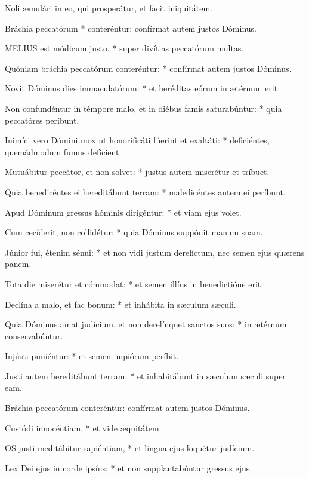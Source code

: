  Noli æmulári in eo, qui prosperátur, et facit iniquitátem.

 Bráchia peccatórum * conteréntur: confírmat autem justos Dóminus.


\lettrine[lines=2]{M}{ELIUS} est módicum justo, * super divítias peccatórum multas.

Quóniam bráchia peccatórum conteréntur: * confírmat autem justos Dóminus.

Novit Dóminus dies immaculatórum: * et heréditas eórum in ætérnum erit.

Non confundéntur in témpore malo, et in diébus famis saturabúntur: * quia peccatóres períbunt.

Inimíci vero Dómini mox ut honorificáti fúerint et exaltáti: * deficiéntes, quemádmodum fumus defícient.

Mutuábitur peccátor, et non solvet: * justus autem miserétur et tríbuet.

Quia benedicéntes ei hereditábunt terram: * maledicéntes autem ei períbunt.

Apud Dóminum gressus hóminis dirigéntur: * et viam ejus volet.

Cum cecíderit, non collidétur: * quia Dóminus suppónit manum suam.

Júnior fui, étenim sénui: * et non vidi justum derelíctum, nec semen ejus quærens panem.

Tota die miserétur et cómmodat: * et semen illíus in benedictióne erit.

Declína a malo, et fac bonum: * et inhábita in sæculum sæculi.

Quia Dóminus amat judícium, et non derelínquet sanctos suos: * in ætérnum conservabúntur.

Injústi puniéntur: * et semen impiórum períbit.

Justi autem hereditábunt terram: * et inhabitábunt in sæculum sæculi super eam.

 Bráchia peccatórum conteréntur: confírmat autem justos Dóminus.

 Custódi innocéntiam, * et vide æquitátem.


\lettrine[lines=2]{O}{S} justi meditábitur sapiéntiam, * et lingua ejus loquétur judícium.

Lex Dei ejus in corde ipsíus: * et non supplantabúntur gressus ejus.

